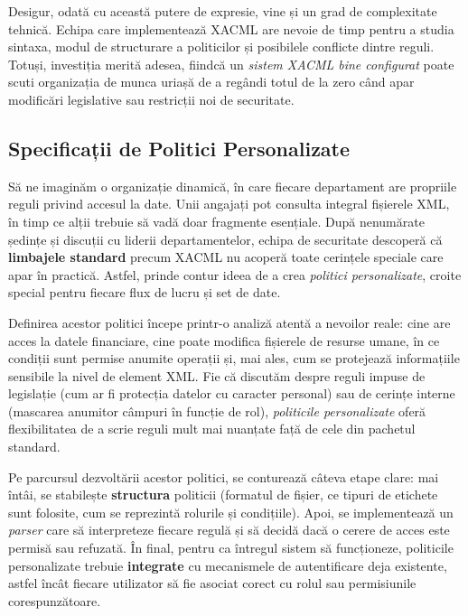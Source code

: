 \documentclass[runningheads]{llncs}
\begin{document}
Desigur, odată cu această putere de expresie, vine și un grad de complexitate tehnică. Echipa care implementează XACML are nevoie de timp pentru a studia sintaxa, modul de structurare a politicilor și posibilele conflicte dintre reguli. Totuși, investiția merită adesea, fiindcă un \emph{sistem XACML bine configurat} poate scuti organizația de munca uriașă de a regândi totul de la zero când apar modificări legislative sau restricții noi de securitate.



\subsection{Specificații de Politici Personalizate}
\label{sec:custom-policy-specs}

Să ne imaginăm o organizație dinamică, în care fiecare departament are propriile reguli privind accesul la date. Unii angajați pot consulta integral fișierele XML, în timp ce alții trebuie să vadă doar fragmente esențiale. După nenumărate ședințe și discuții cu liderii departamentelor, echipa de securitate descoperă că \textbf{limbajele standard} precum XACML nu acoperă toate cerințele speciale care apar în practică. Astfel, prinde contur ideea de a crea \emph{politici personalizate}, croite special pentru fiecare flux de lucru și set de date.

Definirea acestor politici începe printr-o analiză atentă a nevoilor reale: cine are acces la datele financiare, cine poate modifica fișierele de resurse umane, în ce condiții sunt permise anumite operații și, mai ales, cum se protejează informațiile sensibile la nivel de element XML. Fie că discutăm despre reguli impuse de legislație (cum ar fi protecția datelor cu caracter personal) sau de cerințe interne (mascarea anumitor câmpuri în funcție de rol), \emph{politicile personalizate} oferă flexibilitatea de a scrie reguli mult mai nuanțate față de cele din pachetul standard.

Pe parcursul dezvoltării acestor politici, se conturează câteva etape clare: mai întâi, se stabilește \textbf{structura} politicii (formatul de fișier, ce tipuri de etichete sunt folosite, cum se reprezintă rolurile și condițiile). Apoi, se implementează un \emph{parser} care să interpreteze fiecare regulă și să decidă dacă o cerere de acces este permisă sau refuzată. În final, pentru ca întregul sistem să funcționeze, politicile personalizate trebuie \textbf{integrate} cu mecanismele de autentificare deja existente, astfel încât fiecare utilizator să fie asociat corect cu rolul sau permisiunile corespunzătoare.
\end{document}
